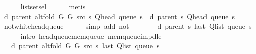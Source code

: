 \begin{isabellebody}
\ \ \ \ \isamarkupfalse%
\ list{\isachardot}{\kern0pt}set{\isacharunderscore}{\kern0pt}sel{\isacharparenleft}{\kern0pt}{}{\isacharparenright}{\kern0pt}\isanewline
\ \ \ \ \isamarkupfalse%
\ metis\isanewline
\isanewline
\ \ \isamarkupfalse%
\ {\isachardoublequoteopen}d\ {\isacharparenleft}{\kern0pt}parent\ {\isacharparenleft}{\kern0pt}alt{\isacharunderscore}{\kern0pt}fold\ G{}\ G{}\ src\ s{\isacharparenright}{\kern0pt}{\isacharparenright}{\kern0pt}\ {\isacharparenleft}{\kern0pt}Q{\isacharunderscore}{\kern0pt}head\ {\isacharparenleft}{\kern0pt}queue\ s{\isacharparenright}{\kern0pt}{\isacharparenright}{\kern0pt}\ {\isacharequal}{\kern0pt}\ d\ {\isacharparenleft}{\kern0pt}parent\ s{\isacharparenright}{\kern0pt}\ {\isacharparenleft}{\kern0pt}Q{\isacharunderscore}{\kern0pt}head\ {\isacharparenleft}{\kern0pt}queue\ s{\isacharparenright}{\kern0pt}{\isacharparenright}{\kern0pt}{\isachardoublequoteclose}\isanewline
\ \ \ \ \isamarkupfalse%
\ not{\isacharunderscore}{\kern0pt}white{\isacharunderscore}{\kern0pt}head{\isacharunderscore}{\kern0pt}queue\isanewline
\ \ \ \ \isamarkupfalse%
\ {\isacharparenleft}{\kern0pt}simp\ add{\isacharcolon}{\kern0pt}\ not{\isacharunderscore}{\kern0pt}{\isacharparenleft}{\kern0pt}{}{\isacharparenright}{\kern0pt}{\isacharparenright}{\kern0pt}\isanewline
\ \ \isamarkupfalse%
\ \isamarkupfalse%
\ {\isachardoublequoteopen}{\isachardot}{\kern0pt}{\isachardot}{\kern0pt}{\isachardot}{\kern0pt}\ {\isasymle}\ d\ {\isacharparenleft}{\kern0pt}parent\ s{\isacharparenright}{\kern0pt}\ {\isacharparenleft}{\kern0pt}last\ {\isacharparenleft}{\kern0pt}Q{\isacharunderscore}{\kern0pt}list\ {\isacharparenleft}{\kern0pt}queue\ s{\isacharparenright}{\kern0pt}{\isacharparenright}{\kern0pt}{\isacharparenright}{\kern0pt}{\isachardoublequoteclose}\isanewline
\ \ \ \ \isamarkupfalse%
\ {\isacharparenleft}{\kern0pt}intro\ head{\isacharunderscore}{\kern0pt}queue{\isacharunderscore}{\kern0pt}mem{\isacharunderscore}{\kern0pt}queue\ mem{\isacharunderscore}{\kern0pt}queue{\isacharunderscore}{\kern0pt}imp{\isacharunderscore}{\kern0pt}d{\isacharunderscore}{\kern0pt}le{\isacharparenright}{\kern0pt}\isanewline
\ \ \isamarkupfalse%
\ \isamarkupfalse%
\ {\isachardoublequoteopen}{\isachardot}{\kern0pt}{\isachardot}{\kern0pt}{\isachardot}{\kern0pt}\ {\isacharequal}{\kern0pt}\ d\ {\isacharparenleft}{\kern0pt}parent\ {\isacharparenleft}{\kern0pt}alt{\isacharunderscore}{\kern0pt}fold\ G{}\ G{}\ src\ s{\isacharparenright}{\kern0pt}{\isacharparenright}{\kern0pt}\ {\isacharparenleft}{\kern0pt}last\ {\isacharparenleft}{\kern0pt}Q{\isacharunderscore}{\kern0pt}list\ {\isacharparenleft}{\kern0pt}queue\ s{\isacharparenright}{\kern0pt}{\isacharparenright}{\kern0pt}{\isacharparenright}{\kern0pt}{\isachardoublequoteclose}\isanewline

\end{isabellebody}
